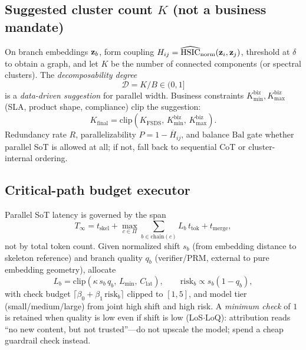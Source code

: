 \subsection{Suggested cluster count $K$ (not a business mandate)}
\label{sec:k-suggested}

On branch embeddings $\mathbf{z}_b$, form coupling $H_{ij}=\widehat{\mathrm{HSIC}}_{\mathrm{norm}}(\mathbf{z}_i,\mathbf{z}_j)$,
threshold at $\delta$ to obtain a graph, and let $K$ be the number of connected
components (or spectral clusters). The \emph{decomposability degree}
\begin{equation}
  \mathcal{D} = K/B \in (0,1]
\end{equation}
is a \emph{data-driven suggestion} for parallel width. Business constraints
$K_{\min}^{\mathrm{biz}}, K_{\max}^{\mathrm{biz}}$ (SLA, product shape, compliance)
clip the suggestion:
\begin{equation}
  K_{\mathrm{final}} = \mathrm{clip}(K_{\mathrm{FSDS}},\, K_{\min}^{\mathrm{biz}},\, K_{\max}^{\mathrm{biz}}).
\end{equation}
Redundancy rate $R$, parallelizability $P=1-\overline{H}_{ij}$, and balance
$\mathrm{Bal}$ gate whether parallel SoT is allowed at all; if not, fall back to
sequential CoT or cluster-internal ordering.

\subsection{Critical-path budget executor}
\label{sec:budget-exec}

Parallel SoT latency is governed by the span
\begin{equation}
  T_{\infty} = t_{\mathrm{skel}} + \max_{c\in\Pi}\sum_{b\in\mathrm{chain}(c)} L_b\, t_{\mathrm{tok}} + t_{\mathrm{merge}},
\end{equation}
not by total token count. Given normalized shift $s_b$ (from embedding distance
to skeleton reference) and branch quality $q_b$ (verifier/PRM, external to pure
embedding geometry), allocate
\begin{equation}
  L_b = \mathrm{clip}(\kappa\, s_b\, q_b,\, L_{\min},\, C_{\mathrm{lat}}),
  \qquad
  \mathrm{risk}_b \propto s_b(1-q_b),
\end{equation}
with check budget $\lceil \beta_0 + \beta_1\,\mathrm{risk}_b\rceil$ clipped to
$[1,5]$, and model tier (small/medium/large) from joint high shift and high risk.
A \emph{minimum check} of $1$ is retained when quality is low even if shift is
low (LoS$\cdot$LoQ): attribution reads ``no new content, but not trusted''---do
not upscale the model; spend a cheap guardrail check instead.

